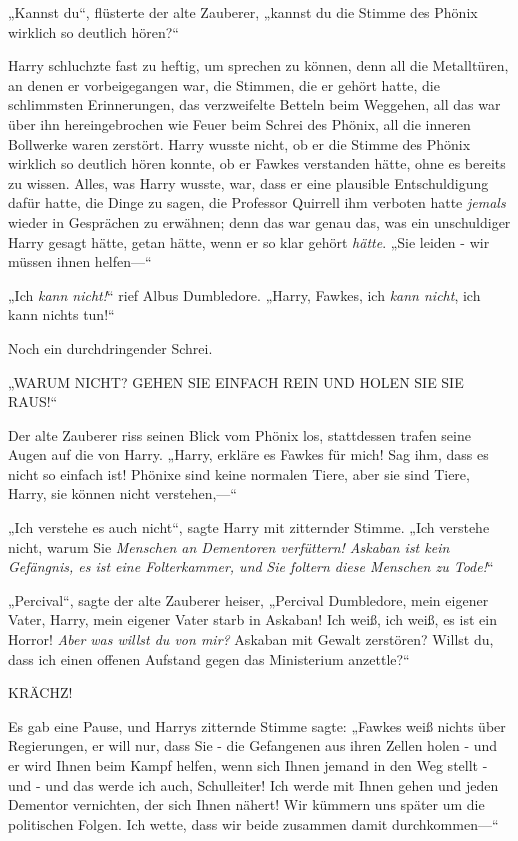 {„Kannst du“, flüsterte der alte Zauberer, „kannst du die Stimme des Phönix wirklich so deutlich hören?“

Harry schluchzte fast zu heftig, um sprechen zu können, denn all die Metalltüren, an denen er vorbeigegangen war, die Stimmen, die er gehört hatte, die schlimmsten Erinnerungen, das verzweifelte Betteln beim Weggehen, all das war über ihn hereingebrochen wie Feuer beim Schrei des Phönix, all die inneren Bollwerke waren zerstört. Harry wusste nicht, ob er die Stimme des Phönix wirklich so deutlich hören konnte, ob er Fawkes verstanden hätte, ohne es bereits zu wissen. Alles, was Harry wusste, war, dass er eine plausible Entschuldigung dafür hatte, die Dinge zu sagen, die Professor Quirrell ihm verboten hatte \emph{jemals} wieder in Gesprächen zu erwähnen; denn das war genau das, was ein unschuldiger Harry gesagt hätte, getan hätte, wenn er so klar gehört \emph{hätte}. „Sie leiden - wir müssen ihnen helfen—“

„Ich \emph{kann nicht!}“ rief Albus Dumbledore. „Harry, Fawkes, ich \emph{kann nicht}, ich kann nichts tun!“

Noch ein durchdringender Schrei.

„WARUM NICHT? GEHEN SIE EINFACH REIN UND HOLEN SIE SIE RAUS!“

Der alte Zauberer riss seinen Blick vom Phönix los, stattdessen trafen seine Augen auf die von Harry. „Harry, erkläre es Fawkes für mich! Sag ihm, dass es nicht so einfach ist! Phönixe sind keine normalen Tiere, aber sie sind Tiere, Harry, sie können nicht verstehen,—“

„Ich verstehe es auch nicht“, sagte Harry mit zitternder Stimme. „Ich verstehe nicht, warum Sie \emph{Menschen an Dementoren verfüttern! Askaban ist kein Gefängnis, es ist eine Folterkammer, und} \emph{Sie foltern diese Menschen zu Tode!}“

„Percival“, sagte der alte Zauberer heiser, „Percival Dumbledore, mein eigener Vater, Harry, mein eigener Vater starb in Askaban! Ich weiß, ich weiß, es ist ein Horror! \emph{Aber was willst du von mir?} Askaban mit Gewalt zerstören? Willst du, dass ich einen offenen Aufstand gegen das Ministerium anzettle?“

KRÄCHZ!

Es gab eine Pause, und Harrys zitternde Stimme sagte: „Fawkes weiß nichts über Regierungen, er will nur, dass Sie - die Gefangenen aus ihren Zellen holen - und er wird Ihnen beim Kampf helfen, wenn sich Ihnen jemand in den Weg stellt - und - und das werde ich auch, Schulleiter! Ich werde mit Ihnen gehen und jeden Dementor vernichten, der sich Ihnen nähert! Wir kümmern uns später um die politischen Folgen. Ich wette, dass wir beide zusammen damit durchkommen—“

}
